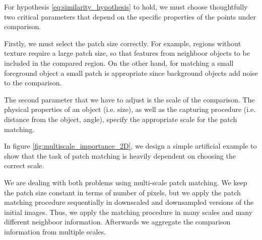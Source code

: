 \documentclass[runningheads]{llncs}
\begin{document}
For hypothesis \ref{eq:similarity_hypothesis} to hold, we must choose thoughtfully two critical parameters that depend on the specific properties of the points under comparison. 

Firstly, we must select the patch size correctly. For example, regions without texture require a large patch size, so that features from neighboor objects to be included in the compared region. On the other hand, for matching a small foreground object a small patch is appropriate since background objects add noise to the comparison.

The second parameter that we have to adjust is the scale of the comparison. The physical properties of an object (i.e. size), as well as the capturing procedure (i.e. distance from the object, angle), specify the appropriate scale for the patch matching. 

In figure \ref{fig:multiscale_importance_2D}, we design a simple artificial example to show that the task of patch matching is heavily dependent on choosing the correct scale.

We are dealing with both problems using multi-scale patch matching. We keep the patch size constant in terms of number of pixels, but we apply the patch matching procedure sequentially in downscaled and downsampled versions of the initial images. Thus, we apply the matching procedure in many scales and many different neighboor information. Afterwards we aggregate the comparison information from multiple scales.
\end{document}
